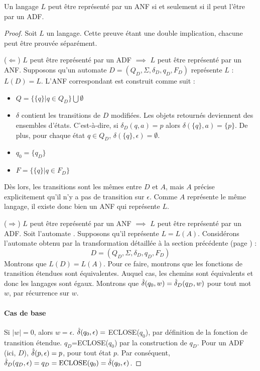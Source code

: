 \begin{theorem}\label{anf-dnf}
	Un langage $L$ peut être représenté par un ANF si et seulement si il peut l'être par un ADF.
\end{theorem}

\begin{proof}
	 Soit $L$ un langage. Cette preuve étant une double implication, chacune peut être prouvée séparément.

	($\Leftarrow$) $L$ peut être représenté par un ADF $\implies$ $L$ peut être représenté par un ANF. Supposons qu'un automate $D=(Q_D, \Sigma, \delta_D, q_D, F_D)$ représente $L$ : $L(D)=L$.
	L'ANF \automaton correspondant est construit comme suit :

	\begin{itemize}
		\item $Q=\{\{q\}|q\in Q_D\}\bigcup\emptyset$
		\item $\delta$ contient les transitions de $D$ modifiées. Les objets retournés deviennent des ensembles d'états. C'est-à-dire, si $\delta_D(q,a)=p$ alors $\delta(\{q\},a)=\{p\}$. De plus, pour chaque état $q\in Q_D$, $\delta(\{q\},\epsilon)=\emptyset$.
		\item $q_0=\{q_D\}$
		\item $F=\{\{q\}| q\in F_D\}$
	\end{itemize}

	 Dès lors, les transitions sont les mêmes entre $D$ et $A$, mais $A$ précise explicitement qu'il n'y a pas de transition sur $\epsilon$. Comme $A$ représente le même langage, il existe donc bien un ANF qui représente $L$.


	($\Rightarrow$) $L$ peut être représenté par un ANF $\implies$ $L$ peut être représenté par un ADF. Soit l'automate \automaton. Supposons qu'il représente $L=L(A)$. Considérons l'automate obtenu par la transformation détaillée à la section précédente (page \pageref{ex:anfadf}) :
	$$
	D=(Q_D, \Sigma, \delta_D, q_D, F_D)
	$$
	Montrons que $L(D)=L(A)$. Pour ce faire, montrons que les fonctions de transition étendues sont équivalentes. Auquel cas, les chemins sont équivalents et donc les langages sont égaux.
	Montrons que $\hat{\delta}(q_0,w)=\hat{\delta}_D(q_D,w)$ pour tout mot $w$, par récurrence sur $w$.

	\paragraph{Cas de base} Si $|w|=0$, alors $w=\epsilon$. $\hat{\delta}(q_0,\epsilon)=$ ECLOSE($q_0$), par définition de la fonction de transition étendue. $q_D$=ECLOSE($q_0$) par la construction de $q_D$. Pour un ADF (ici, $D$), $\hat{\delta}(p,\epsilon)=p$, pour tout état $p$. Par conséquent, $\hat{\delta}_D(q_D,\epsilon)=q_D=\text{ECLOSE(}q_0\text{)}=\hat{\delta}(q_0,\epsilon)$.


\end{proof}
